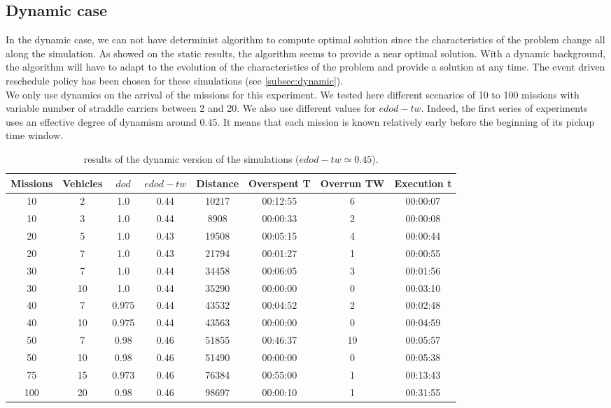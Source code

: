 \documentclass[review]{elsarticle}
\begin{document}
	\subsection{Dynamic case}
  In the dynamic case, we can not have determinist algorithm to compute optimal solution since the characteristics of the problem change all along the simulation. As showed on the static results, the algorithm seems to provide a near optimal solution. With a dynamic background, the algorithm will have to adapt to the evolution of the characteristics of the problem and provide a solution at any time. The event driven reschedule policy has been chosen for these simulations (see \ref{subsec:dynamic}).\\

  We only use dynamics on the arrival of the missions for this experiment. We tested here different scenarios of 10 to 100 missions with variable number of straddle carriers between 2 and 20. We also use different values for $edod-tw$. Indeed, the first series of experiments uses an effective degree of dynamism around $0.45$. It means that each mission is known relatively early before the beginning of its pickup time window.

  \small
\begin{table}[h]
  \begin{center}
    \begin{tabular}{|c|c|c|c|c|c|c|c|} 
    \hline
    \bf{Missions} & \bf{Vehicles} & \bf{$dod$} & \bf{$edod-tw$} & \bf{Distance} & \bf{Overspent T} & \bf{Overrun TW} &  \bf{Execution t} \\ \hline
    10	 & 2 	& 1.0	& 0.44	& 10217	& 00:12:55	& 6	& 00:00:07\\
    10	 & 3 	& 1.0	& 0.44	& 8908	& 00:00:33	& 2	& 00:00:08\\
    20	 & 5 	& 1.0	& 0.43	& 19508	& 00:05:15	& 4	& 00:00:44\\
    20	 & 7 	& 1.0	& 0.43	& 21794	& 00:01:27	& 1	& 00:00:55\\
    30	 & 7 	& 1.0	& 0.44	& 34458	& 00:06:05	& 3	& 00:01:56\\
    30	 & 10 	& 1.0	& 0.44	& 35290	& 00:00:00	& 0	& 00:03:10\\
    40	 & 7 	& 0.975	& 0.44	& 43532	& 00:04:52	& 2	& 00:02:48\\
    40	 & 10 	& 0.975	& 0.44	& 43563	& 00:00:00	& 0	& 00:04:59\\
    50	 & 7 	& 0.98	& 0.46	& 51855	& 00:46:37	& 19	& 00:05:57\\
    50	 & 10 	& 0.98	& 0.46	& 51490	& 00:00:00	& 0	& 00:05:38\\
    75	 & 15 	& 0.973	& 0.46	& 76384	& 00:55:00	& 1	& 00:13:43\\
    100	 & 20 	& 0.98	& 0.46	& 98697	& 00:00:10	& 1	& 00:31:55\\
    \hline
    \end{tabular}
  \caption{results of the dynamic version of the simulations ($edod-tw \simeq 0.45$).}
  \end{center}
\end{table}
\end{document}
